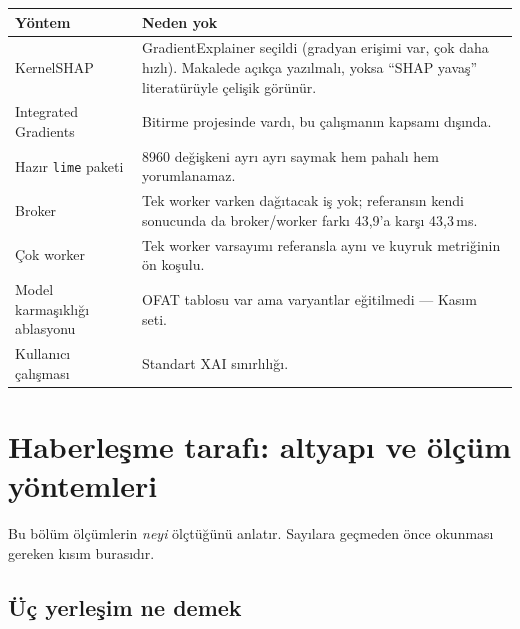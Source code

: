 \documentclass[11pt,a4paper]{article}
\newcommand{\ms}{\,ms}
\newcommand{\kod}[1]{\texttt{\small #1}}
\begin{document}
\begin{table}[H]
\centering\small
\begin{tabular}{@{}p{4.6cm}p{10.4cm}@{}}
\toprule
\textbf{Yöntem} & \textbf{Neden yok} \\
\midrule
KernelSHAP & GradientExplainer seçildi (gradyan erişimi var, çok daha hızlı).
Makalede açıkça yazılmalı, yoksa ``SHAP yavaş'' literatürüyle çelişik görünür. \\
Integrated Gradients & Bitirme projesinde vardı, bu çalışmanın kapsamı dışında. \\
Hazır \kod{lime} paketi & 8960 değişkeni ayrı ayrı saymak hem pahalı hem
yorumlanamaz. \\
Broker & Tek worker varken dağıtacak iş yok; referansın kendi sonucunda da
broker/worker farkı 43{,}9'a karşı 43{,}3\ms. \\
Çok worker & Tek worker varsayımı referansla aynı ve kuyruk metriğinin ön
koşulu. \\
Model karmaşıklığı ablasyonu & OFAT tablosu var ama varyantlar eğitilmedi ---
Kasım seti. \\
Kullanıcı çalışması & Standart XAI sınırlılığı. \\
\bottomrule
\end{tabular}
\end{table}

\section{Haberleşme tarafı: altyapı ve ölçüm yöntemleri}

Bu bölüm ölçümlerin \emph{neyi} ölçtüğünü anlatır. Sayılara geçmeden önce
okunması gereken kısım burasıdır.

\subsection{Üç yerleşim ne demek}
\end{document}
